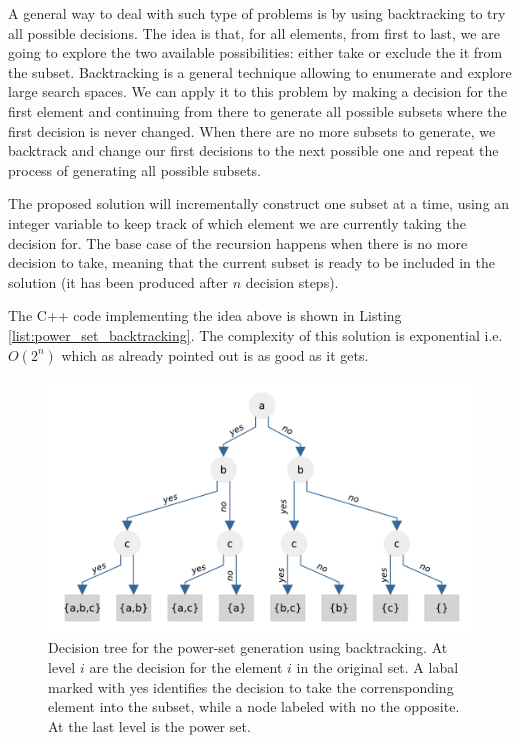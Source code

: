 A general way to deal with such type of problems is by using backtracking to try all possible
decisions.
The idea is that, for all elements, from first to last, we are going to
explore the two available possibilities: either take or exclude the
it from the subset.
Backtracking is a general technique allowing to enumerate and explore
large search spaces. We can apply it to this problem by making a decision for
the first element and continuing from there to generate all possible subsets
where the first decision is never changed. 
When there are no more subsets to generate, we backtrack and change our first
decisions to the next possible one and repeat the process of generating all possible subsets.

The proposed solution will incrementally construct one subset at a time, 
using an integer variable to keep track of which element we are currently taking the decision for.
The base case of the recursion happens when there is no more decision
to take, meaning that the current subset is ready to be included in the solution (it has been
produced after $n$ decision steps).

The C++ code implementing the idea above is shown in Listing \ref{list:power_set_backtracking}. The complexity of this solution is exponential i.e. $O(2^n)$ which as already pointed out is as good as
it gets.





\begin{figure}
    \centering
    \includegraphics[width=\textwidth]{sources/power_set/images/tree}
    \caption[Decision tree for the power-set generation using backtracking.]{Decision tree for the power-set generation using backtracking. At level $i$ are the decision for the element $i$ in the original set. A labal marked with yes identifies the decision to take the corrensponding element into the subset, while a node labeled with no the opposite. At the last level is the power set.}
    \label{ref:power_set_decision_trees}
\end{figure}

